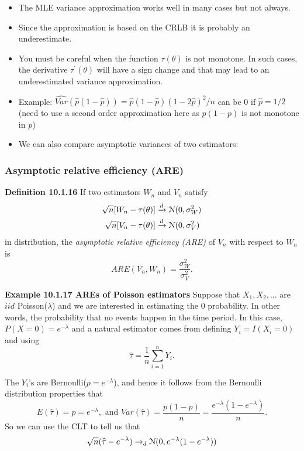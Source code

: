 \documentclass[11pt,]{article}
\def\phat{{\widehat p}}
\def\tauhat{{\widehat\tau}}
\def\Nsc{{\cal N}}
\def\sumin{\sum_{i=1}^n}
\begin{document}
\begin{itemize}
\item The MLE variance approximation works well in many cases but not always.
\item Since the approximation is based on the CRLB it is probably an underestimate.
\item You must be careful when the function $\tau(\theta)$ is not monotone. In such cases, the derivative $\tau^\prime(\theta)$ will have a sign change and that may lead to an underestimated variance approximation.
\item Example: $\widehat{Var}(\phat(1-\phat)) = \phat(1-\phat)(1-2\phat)^2/n$ can be 0 if $\phat = 1/2$ (need to use a second order approximation here as $p(1-p)$ is not monotone in $p$)
\item We can also compare asymptotic variances of two estimators:
\end{itemize}

\hypertarget{asymptotic-relative-efficiency-are}{%
\subsubsection{Asymptotic relative efficiency
(ARE)}\label{asymptotic-relative-efficiency-are}}

\noindent\textbf{Definition 10.1.16} If two estimators \(W_n\) and
\(V_n\) satisfy \begin{align*}
\sqrt{n}[W_n - \tau(\theta)] &\xrightarrow{d} \Nsc(0,\sigma^2_W)\\
\sqrt{n}[V_n - \tau(\theta)] &\xrightarrow{d}  \Nsc(0,\sigma^2_V)
\end{align*} in distribution, the \emph{asymptotic relative efficiency
(ARE)} of \(V_n\) with respect to \(W_n\) is
\[ARE(V_n, W_n) = \frac{\sigma^2_W}{\sigma^2_V}.\]

\noindent\textbf{Example 10.1.17 AREs of Poisson estimators} Suppose
that \(X_1, X_2, \ldots\) are \(iid\) Poisson(\(\lambda\)) and we are
interested in estimating the 0 probability. In other words, the
probability that no events happen in the time period. In this case,
\(P(X=0) = e^{-\lambda}\) and a natural estimator comes from defining
\(Y_i = I(X_i = 0)\) and using \[\tauhat = \frac{1}{n} \sumin Y_i.\]

The \(Y_i\)'s are Bernoulli(\(p = e^{-\lambda}\)), and hence it follows
from the Bernoulli distribution properties that
\[E(\tauhat) = p = e^{-\lambda}, \mbox{ and } Var(\tauhat) = \frac{p(1-p)}{n} = \frac{e^{-\lambda}(1-e^{-\lambda})}{n}.\]
So we can use the CLT to tell us that
\[\sqrt{n}(\tauhat - e^{-\lambda}) \to_d \Nsc(0, e^{-\lambda}(1-e^{-\lambda}))\]
\end{document}
